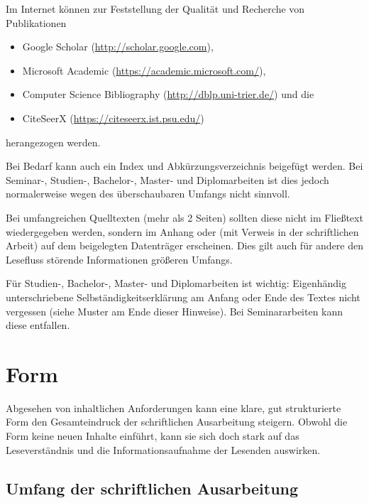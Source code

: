 \documentclass[
    fontsize=12pt,
    headings=small,
    parskip=half,           %
    bibliography=totoc,
    numbers=noenddot,       %
    open=any,               %
    ]{scrreprt}
\begin{document}
Im Internet können zur Feststellung der Qualität und Recherche von Publikationen

\begin{itemize}
	\item Google Scholar (\url{http://scholar.google.com}),
	\item Microsoft Academic (\url{https://academic.microsoft.com/}),
	\item Computer Science Bibliography (\url{http://dblp.uni-trier.de/}) und die
	\item CiteSeerX
		(\url{https://citeseerx.ist.psu.edu/})
\end{itemize}

herangezogen werden.

Bei Bedarf kann auch ein Index und Abkürzungsverzeichnis beigefügt werden. Bei Seminar-, Studien-, Bachelor-, Master- und Diplomarbeiten ist dies jedoch normalerweise wegen des überschaubaren Umfangs nicht sinnvoll.

Bei umfangreichen Quelltexten (mehr als 2 Seiten) sollten diese nicht im Fließtext wiedergegeben werden, sondern im Anhang oder (mit Verweis in der schriftlichen Arbeit) auf dem beigelegten Datenträger erscheinen. Dies gilt auch für andere den Lesefluss störende Informationen größeren Umfangs.

Für Studien-, Bachelor-, Master- und Diplomarbeiten ist wichtig: Eigenhändig unterschriebene Selbständigkeitserklärung am Anfang oder Ende des Textes nicht vergessen (siehe Muster am Ende dieser Hinweise). Bei Seminararbeiten kann diese entfallen.

\chapter{Form}
\label{sec.form}

Abgesehen von inhaltlichen Anforderungen kann eine klare, gut strukturierte Form den Gesamteindruck der schriftlichen Ausarbeitung steigern. Obwohl die Form keine neuen Inhalte einführt, kann sie sich doch stark auf das Leseverständnis und die Informationsaufnahme der Lesenden auswirken. 

\section{Umfang der schriftlichen Ausarbeitung}
\label{sec.umfang}
\end{document}
